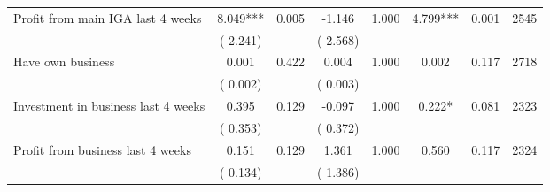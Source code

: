 \begin{tabular}{l*{7}{c}}
 Profit from main IGA last 4 weeks       &              8.049***       &        0.005  &             -1.146       &        1.000  &              4.799***       &              0.001 &  2545 \\ 
                       &       (       2.241)             &                               &       (       2.568)                     &                               &                                               &                                &                      \\ 

 Have own business       &              0.001       &        0.422  &              0.004       &        1.000  &              0.002       &              0.117 &  2718 \\ 
                       &       (       0.002)             &                               &       (       0.003)                     &                               &                                               &                                &                      \\ 

 Investment in business last 4 weeks       &              0.395       &        0.129  &             -0.097       &        1.000  &              0.222*       &              0.081 &  2323 \\ 
                       &       (       0.353)             &                               &       (       0.372)                     &                               &                                               &                                &                      \\ 

 Profit from business last 4 weeks       &              0.151       &        0.129  &              1.361       &        1.000  &              0.560       &              0.117 &  2324 \\ 
                       &       (       0.134)             &                               &       (       1.386)                     &                               &                                               &                                &                      \\ 

\hline \end{tabular}